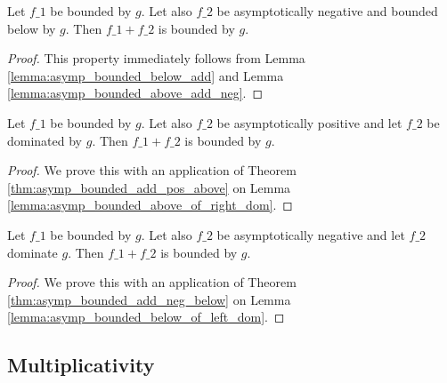 \begin{theorem}
    \label{thm:asymp_bounded_add_neg_below}
    \leanok
    Let $f\_1$ be bounded by $g$. Let also $f\_2$ be asymptotically negative and
    bounded below by $g$. Then $f\_1 + f\_2$ is bounded by $g$.
\end{theorem}

\begin{proof}
    \leanok
    This property immediately follows from Lemma \ref{lemma:asymp_bounded_below_add}
    and Lemma \ref{lemma:asymp_bounded_above_add_neg}.
\end{proof}

\begin{theorem}
    \label{thm:asymp_bounded_add_pos_right_dom}
    \leanok
    Let $f\_1$ be bounded by $g$. Let also $f\_2$ be asymptotically positive and
    let $f\_2$ be dominated by $g$. Then $f\_1 + f\_2$ is bounded by $g$.
\end{theorem}

\begin{proof}
    \leanok
    We prove this with an application of Theorem \ref{thm:asymp_bounded_add_pos_above}
    on Lemma \ref{lemma:asymp_bounded_above_of_right_dom}.
\end{proof}

\begin{theorem}
    \label{thm:asymp_bounded_add_neg_left_dom}
    \leanok
    Let $f\_1$ be bounded by $g$. Let also $f\_2$ be asymptotically negative and
    let $f\_2$ dominate $g$. Then $f\_1 + f\_2$ is bounded by $g$.
\end{theorem}

\begin{proof}
    \leanok
    We prove this with an application of Theorem \ref{thm:asymp_bounded_add_neg_below}
    on Lemma \ref{lemma:asymp_bounded_below_of_left_dom}.
\end{proof}


\subsection{Multiplicativity}


